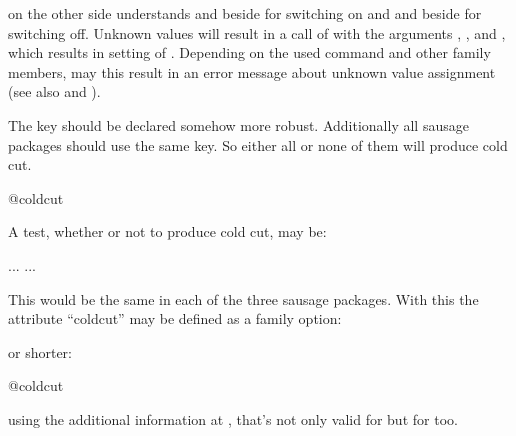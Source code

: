  on the other side understands  
and  beside  for switching on and  and
 beside  for switching off. Unknown values will result
in a call of  with the arguments ,
, and , which results in setting of
. Depending on the used command and other family
members, may this result in an error message about unknown value assignment
(see also  and
).
\begin{Example}
  The key  should be declared somehow more robust. Additionally
  all sausage packages should use the same key. So either all or none of them
  will produce cold cut.
\begin{lstcode}
                         {@coldcut}
\end{lstcode}
  A test, whether or not to produce cold cut, may be:
\begin{lstcode}
  \if@coldcut
     ...
  \else
     ...
  \fi
\end{lstcode}
  This would be the same in each of the three sausage packages. With this the
  attribute ``coldcut'' may be defined as a family option:
  or shorter:
\begin{lstcode}
                           {@coldcut}
\end{lstcode}
  using the additional information at
  , that's not only valid
  for  but for  too.
\end{Example}
%
%



